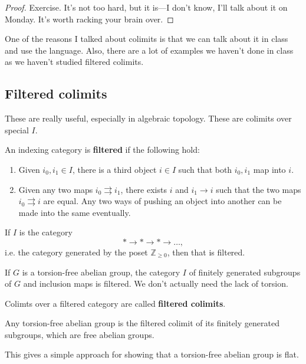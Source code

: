 \begin{proof} 
Exercise. It's not too hard, but it is---I don't know, I'll talk about it on
Monday. It's worth racking your brain over.
\end{proof} 

One of the reasons I talked about colimits is that we can talk about it in
class and use the language. Also, there are a lot of examples we haven't done
in class as we haven't studied filtered colimits.

\subsection{Filtered colimits}

These are really useful, especially in algebraic topology. These are colimits
over special $I$.

\begin{definition} 
An indexing category is \textbf{filtered} if the following hold:
\begin{enumerate}
\item Given $i_0, i_1 \in I$, there is a third object $i \in I$ such that both
$i_0, i_1$ map into $i$. 
\item Given any two maps $i_0 \rightrightarrows i_1$, there exists $i$ and $i_1
\to i$ such that the two maps $i_0 \rightrightarrows i$ are equal. Any two ways
of pushing an object into another can be made into the same eventually. 
\end{enumerate}
\end{definition} 

\begin{example} 
If $I$ is the category
\[ \ast \to \ast \to \ast \to \dots,  \]
i.e. the category generated by the poset $\mathbb{Z}_{\geq 0}$, then that is
filtered.
\end{example} 

\begin{example} 
If $G$ is a torsion-free abelian group, the category $I$ of finitely generated
subgroups of $G$ and inclusion maps is filtered. We don't actually need the
lack of torsion. 
\end{example} 

\begin{definition} 
Colimts over a filtered category are called \textbf{filtered colimits}.
\end{definition} 

\begin{example} 
Any torsion-free abelian group is the filtered colimit of its finitely
generated subgroups, which are free abelian groups.  
\end{example} 
This gives a simple approach for showing that a torsion-free abelian group is
flat.

